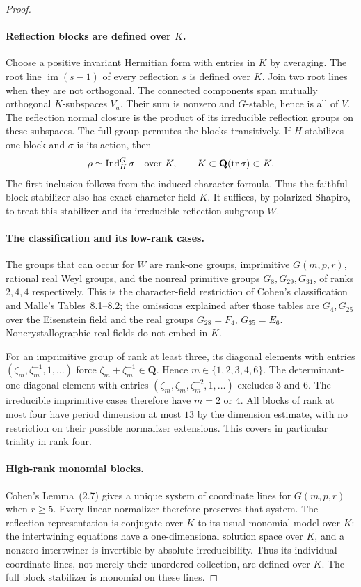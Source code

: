 \documentclass[11pt]{article}
\theoremstyle{definition}
\theoremstyle{remark}
\newcommand{\Q}{\mathbf Q}
\begin{document}
\begin{proof}
\paragraph{Reflection blocks are defined over $K$.}
Choose a positive invariant Hermitian form with entries in $K$ by
averaging. The root line $\operatorname{im}(s-1)$ of every reflection
$s$ is defined over $K$. Join two root lines when they are not orthogonal.
The connected components span mutually orthogonal $K$-subspaces $V_a$.
Their sum is nonzero and $G$-stable, hence is all of $V$.
The reflection normal closure is the product of its irreducible
reflection groups on these subspaces. The full group permutes the
blocks transitively. If $H$ stabilizes one block and $\sigma$ is its
action, then
\[
 \rho\simeq\operatorname{Ind}_H^G\sigma\quad\hbox{over }K,
 \qquad
 K\subset\Q(\operatorname{tr}\sigma)\subset K.
\]
The first inclusion follows from the induced-character formula. Thus
the faithful block stabilizer also has exact character field $K$.
It suffices, by polarized Shapiro, to treat this stabilizer and its
irreducible reflection subgroup $W$.

\paragraph{The classification and its low-rank cases.}
The groups that can occur for $W$ are rank-one groups, imprimitive
$G(m,p,r)$, rational real Weyl groups, and the nonreal primitive groups
$G_8,G_{29},G_{31}$, of ranks $2,4,4$ respectively. This is the
character-field restriction of Cohen's classification and Malle's
Tables~8.1--8.2; the omissions explained after those tables are
$G_4,G_{25}$ over the Eisenstein field and the real groups
$G_{28}=F_4$, $G_{35}=E_6$. Noncrystallographic real fields do not
embed in $K$.

For an imprimitive group of rank at least three, its diagonal elements
with entries $(\zeta_m,\zeta_m^{-1},1,\ldots)$ force
$\zeta_m+\zeta_m^{-1}\in\Q$. Hence $m\in\{1,2,3,4,6\}$.
The determinant-one diagonal element with entries
$(\zeta_m,\zeta_m,\zeta_m^{-2},1,\ldots)$ excludes $3$ and $6$.
The irreducible imprimitive cases therefore have $m=2$ or $4$.
All blocks of rank at most four have period dimension at most $13$
by the dimension estimate, with no restriction on their possible normalizer extensions.
This covers in particular triality in rank four.

\paragraph{High-rank monomial blocks.}
Cohen's Lemma~(2.7) gives a unique system of coordinate lines for
$G(m,p,r)$ when $r\ge5$. Every linear normalizer therefore preserves
that system. The reflection representation is conjugate over $K$ to
its usual monomial model over $K$: the intertwining equations have a
one-dimensional solution space over $K$, and a nonzero intertwiner is
invertible by absolute irreducibility. Thus its individual coordinate
lines, not merely their unordered collection, are defined over $K$.
The full block stabilizer is monomial on these lines.


\end{proof}
\end{document}

